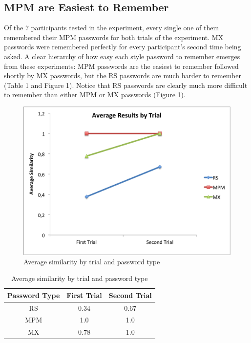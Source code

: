 \documentclass{article}
\begin{document}
\subsection*{MPM are Easiest to Remember}
Of the 7 participants tested in the experiment, every single one of them remembered their MPM passwords for both trials of the experiment. MX passwords were remembered perfectly for every participant's second time being asked. A clear hierarchy of how easy each style password to remember emerges from these experiments: MPM passwords are the easiest to remember followed shortly by MX passwords, but the RS passwords are much harder to remember (Table 1 and Figure 1). Notice that RS passwords are clearly much more difficult to remember than either MPM or MX passwords (Figure 1).
\begin{figure}
\centering
\includegraphics[scale=0.75]{resultsByTrial.png}
\caption{Average similarity by trial and password type}
\end{figure}

\begin{table}
\centering
\begin{tabular}{|c|c|c|}
\hline
Password Type & First Trial & Second Trial \\
\hline
RS & 0.34 & 0.67 \\
\hline
MPM & 1.0 & 1.0 \\
\hline
MX & 0.78 & 1.0 \\
\hline
\end{tabular}
\caption{Average similarity by trial and password type}
\end{table}
\end{document}
